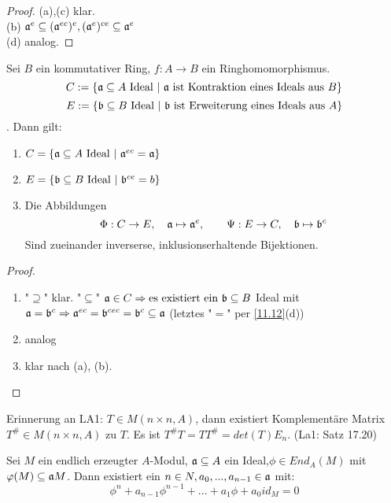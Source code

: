 \begin{proof}
	(a),(c) klar.  \\
	(b) $\mathfrak{a}^e \subseteq (\mathfrak{a}^{ec})^e , (\mathfrak{a}^e)^{ce} \subseteq \mathfrak{a}^e$ \\
	(d) analog. 
\end{proof}
\begin{sa} \label{11.13}
	Sei $B$ ein kommutativer Ring, $f: A \to B $ ein Ringhomomorphismus. \\
	$$C := \{ \a \subseteq A \ \text{Ideal} \ | \ \a \ \text{ist Kontraktion eines Ideals aus }B \} $$
	$$E:= \{\b \subseteq B \ \text{Ideal} \ | \ \b \ \text{ist Erweiterung eines Ideals aus } A\} $$. Dann gilt:
	\begin{enumerate} [label= \alph*)]
		\item $C=\{\mathfrak{a} \subseteq A \ \text{Ideal} \ | \ \mathfrak{a}^{ec} = \mathfrak{a} \} $
		\item $E= \{\b \subseteq B \ \text{Ideal} \ |\ \b^{ce} = b\} $
		\item Die Abbildungen $$\Phi: C \to E, \quad \mathfrak{a} \mapsto \mathfrak{a}^e, \quad \quad \Psi: E \to C, \quad \mathfrak{b} \mapsto \mathfrak{b}^c $$ Sind zueinander inverserse, inklusionserhaltende Bijektionen.
	\end{enumerate}
\end{sa}
\begin{proof}
	\begin{enumerate} [label= \alph*)]
		\item "$\supseteq$" klar. "$\subseteq$" $\mathfrak{a} \in C \Rightarrow \text{es existiert ein } \mathfrak{b} \subseteq B $ Ideal mit $ \mathfrak{a} = \mathfrak{b}^c \Rightarrow \mathfrak{a}^{ec} = \mathfrak{b}^{cec} = \mathfrak{b}^c \subseteq \mathfrak{a}$ (letztes "$=$" per \ref{11.12}(d))
		\item analog 
		\item klar nach (a), (b).
	\end{enumerate}
\end{proof}
\begin{anm}
	Erinnerung an LA1: $T \in M(n \times n, A)$, dann existiert Komplementäre Matrix $T^{\#} \in M(n \times n, A)$ zu $T$. Es ist $T^{\#}T = TT^{\#} = det(T)E_n.$ (La1: Satz 17.20)
\end{anm}
\begin{sa} \label{11.14}
	Sei $M$ ein endlich erzeugter $A$-Modul, $\mathfrak{a} \subseteq A $ ein Ideal,$\phi \in End_A(M)$ mit $ \varphi(M) \subseteq \mathfrak{a} M$. Dann existiert ein $ n \in N, a_0,...,a_{n-1} \in \mathfrak{a} $ mit: 
	$$ \phi^{n} + a_{n-1}\phi^{n-1}+...+ a_1\phi + a_0id_M  = 0 $$
\end{sa} 
